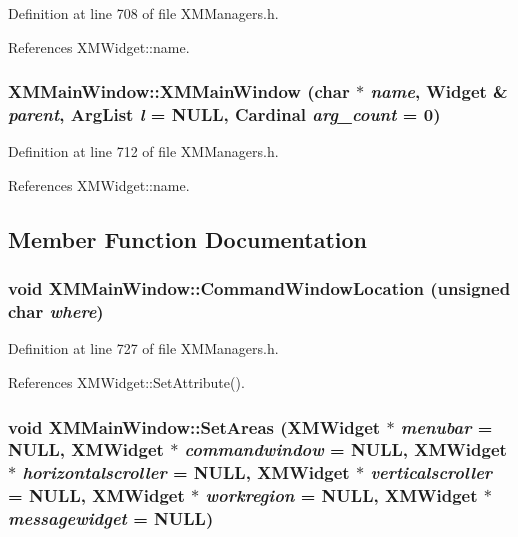 Definition at line 708 of file XMManagers.h.

References XMWidget::name.
\subsubsection{\setlength{\rightskip}{0pt plus 5cm}XMMain\-Window::XMMain\-Window (char $\ast$ {\em name}, Widget \& {\em parent}, Arg\-List {\em l} = NULL, Cardinal {\em arg\_\-count} = 0)\hspace{0.3cm}{\tt  [inline]}}\label{classXMMainWindow_a4}




Definition at line 712 of file XMManagers.h.

References XMWidget::name.

\subsection{Member Function Documentation}
\subsubsection{\setlength{\rightskip}{0pt plus 5cm}void XMMain\-Window::Command\-Window\-Location (unsigned char {\em where})\hspace{0.3cm}{\tt  [inline]}}\label{classXMMainWindow_a7}




Definition at line 727 of file XMManagers.h.

References XMWidget::Set\-Attribute().
\subsubsection{\setlength{\rightskip}{0pt plus 5cm}void XMMain\-Window::Set\-Areas ({\bf XMWidget} $\ast$ {\em menubar} = NULL, {\bf XMWidget} $\ast$ {\em commandwindow} = NULL, {\bf XMWidget} $\ast$ {\em horizontalscroller} = NULL, {\bf XMWidget} $\ast$ {\em verticalscroller} = NULL, {\bf XMWidget} $\ast$ {\em workregion} = NULL, {\bf XMWidget} $\ast$ {\em messagewidget} = NULL)}\label{classXMMainWindow_a5}




